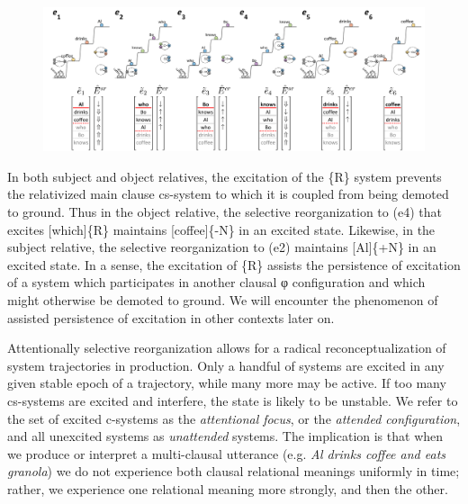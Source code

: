   
\begin{figure}
\includegraphics[width=\textwidth]{figures/Tilsen-img103.png}
\caption{\missingcaption}
\label{fig:}
\end{figure}
 

  In both subject and object relatives, the excitation of the \{R\} system prevents the relativized main clause cs-system to which it is coupled from being demoted to ground. Thus in the object relative, the selective reorganization to (e4) that excites [which]\{R\} maintains [coffee]\{-N\} in an excited state. Likewise, in the subject relative, the selective reorganization to (e2) maintains [Al]\{+N\} in an excited state. In a sense, the excitation of \{R\} assists the persistence of excitation of a system which participates in another clausal φ configuration and which might otherwise be demoted to ground. We will encounter the phenomenon of assisted persistence of excitation in other contexts later on.

Attentionally selective reorganization allows for a radical reconceptualization of system trajectories in production.  Only a handful of systems are excited in any given stable epoch of a trajectory, while many more may be active. If too many cs-systems are excited and interfere, the state is likely to be unstable. We refer to the set of excited c-systems as the \textit{attentional focus}, or the \textit{attended configuration}, and all unexcited systems as \textit{unattended} systems. The implication is that when we produce or interpret a multi-clausal utterance (e.g. \textit{Al drinks coffee and eats granola}) we do not experience both clausal relational meanings uniformly in time; rather, we experience one relational meaning more strongly, and then the other.

